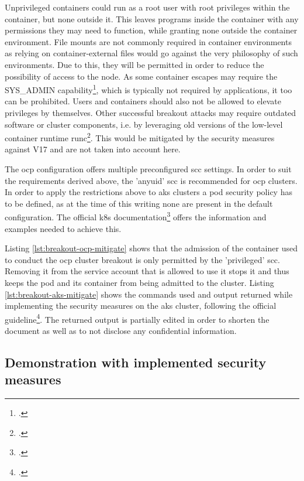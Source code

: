 Unprivileged containers could run as a root user with root privileges within the container, but none outside it. This leaves programs inside the container with any permissions they may need to function, while granting none outside the container environment. File mounts are not commonly required in container environments as relying on container-external files would go against the very philosophy of such environments. Due to this, they will be permitted in order to reduce the possibility of access to the node. As some container escapes may require the SYS{\_}ADMIN capability\footcite[][, section 'Requirements to use this technique']{trailOfBitsEscape}, which is typically not required by applications, it too can be prohibited. Users and containers should also not be allowed to elevate privileges by themselves. Other successful breakout attacks may require outdated software or cluster components, i.e. by leveraging old versions of the low-level container runtime runc\footcite[][, section 'What Is The Vulnerability?']{runcVuln}. This would be mitigated by the security measures against V17 and are not taken into account here.

The \gls{ocp} configuration offers multiple preconfigured \gls{scc} settings. In order to suit the requirements derived above, the 'anyuid' \gls{scc} is recommended for \gls{ocp} clusters.
In order to apply the restrictions above to \gls{aks} clusters a pod security policy has to be defined, as at the time of this writing none are present in the default configuration. The official \gls{k8s} documentation\footcite[][, section 'Example Policies']{securityPolicy} offers the information and examples needed to achieve this.

Listing \ref{lst:breakout-ocp-mitigate} shows that the admission of the container used to conduct the \gls{ocp} cluster breakout is only permitted by the 'privileged' \gls{scc}. Removing it from the service account that is allowed to use it stops it and thus keeps the pod and its container from being admitted to the cluster.
Listing \ref{lst:breakout-aks-mitigate} shows the commands used and output returned while implementing the security measures on the \gls{aks} cluster, following the official guideline\footcite[][, section 'Enable pod security policy on an AKS cluster']{aksPodSecPol}. The returned output is partially edited in order to shorten the document as well as to not disclose any confidential information.

\newpage
\subsection{Demonstration with implemented security measures}

